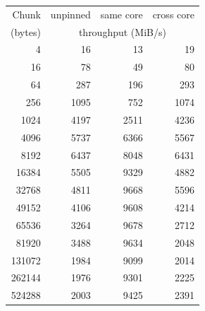 \begin{tabular}{rrrr}
\toprule
Chunk & unpinned & same core & cross core \\
(bytes) & \multicolumn{3}{c}{throughput (MiB/s)} \\
\midrule
4 & 16 & 13 & 19 \\
16 & 78 & 49 & 80 \\
64 & 287 & 196 & 293 \\
256 & 1095 & 752 & 1074 \\
1024 & 4197 & 2511 & 4236 \\
4096 & 5737 & 6366 & 5567 \\
8192 & 6437 & 8048 & 6431 \\
16384 & 5505 & 9329 & 4882 \\
32768 & 4811 & 9668 & 5596 \\
49152 & 4106 & 9608 & 4214 \\
65536 & 3264 & 9678 & 2712 \\
81920 & 3488 & 9634 & 2048 \\
131072 & 1984 & 9099 & 2014 \\
262144 & 1976 & 9301 & 2225 \\
524288 & 2003 & 9425 & 2391 \\
\bottomrule
\end{tabular}
